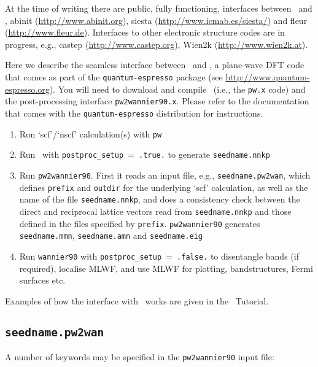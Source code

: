 At the time of writing there are public, fully functioning, interfaces
between \wannier\ and \pwscf,  {\sc abinit} (\url{http://www.abinit.org}), {\sc siesta} (\url{http://www.icmab.es/siesta/})
and {\sc fleur} (\url{http://www.fleur.de}). Interfaces to other
electronic structure codes are in progress, e.g., {\sc castep} (\url{http://www.castep.org}), {\sc Wien2k} (\url{http://www.wien2k.at}).

Here we describe the
seamless interface between \wannier\ and \pwscf, a
plane-wave DFT code that comes as part of the {\tt quantum-espresso}
package (see \url{http://www.quantum-espresso.org}).
You will need
to download and compile \pwscf\ (i.e., the {\tt pw.x} code) and the
post-processing interface {\tt pw2wannier90.x}. Please refer to the
documentation that comes with the {\tt quantum-espresso} distribution
for instructions. 

\begin{enumerate}
\item Run `scf'/`nscf' calculation(s) with \verb#pw#
\item Run \wannier\ with \verb#postproc_setup#~=~\verb#.true.# to
  generate \verb#seedname.nnkp#
\item Run {\tt pw2wannier90}. First it reads an input file, e.g.,
  \verb#seedname.pw2wan#, which defines \verb#prefix# and
  \verb#outdir# for the underlying `scf' calculation, as well as the
  name of the file \verb#seedname.nnkp#, and does a consistency check
  between the direct and reciprocal lattice vectors read from
  \verb#seedname.nnkp# and those defined in the files specified by
  \verb#prefix#. \verb#pw2wannier90# generates \verb#seedname.mmn#,
  \verb#seedname.amn# and \verb#seedname.eig# 
\item Run \verb#wannier90# with \verb#postproc_setup#~=~\verb#.false.# to
  disentangle bands (if required), localise MLWF, and use MLWF for
  plotting, bandstructures, Fermi surfaces etc.
\end{enumerate}

Examples of how the interface with \pwscf\ works are given in the
\wannier\ Tutorial. 

\subsection{{\tt seedname.pw2wan}}

A number of keywords may be specified in the {\tt pw2wannier90} input file:


